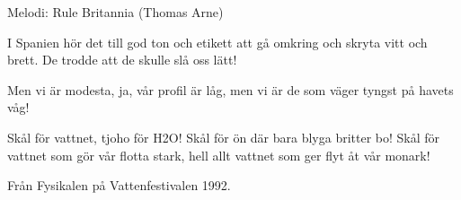 \begin{song}

\begin{songmeta}
Melodi: Rule Britannia (Thomas Arne)
\end{songmeta}

\begin{songtext}
I Spanien hör det till god ton och etikett
att gå omkring och skryta vitt och brett.
De trodde att de skulle slå oss lätt!

Men vi är modesta,
ja, vår profil är låg,
men vi är de som väger tyngst på havets våg!

Skål för vattnet, tjoho för H2O!
Skål för ön där bara blyga britter bo!
Skål för vattnet som gör vår flotta stark,
hell allt vattnet som ger flyt åt vår monark!
\end{songtext}

\begin{songnotes}
Från Fysikalen på Vattenfestivalen 1992.
\end{songnotes}

\end{song}
